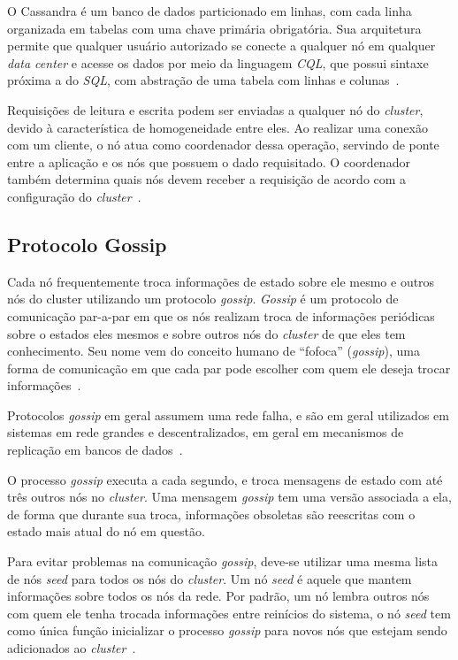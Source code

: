 O Cassandra é um banco de dados particionado em linhas, com cada linha organizada em tabelas com uma chave primária obrigatória. Sua arquitetura permite que qualquer usuário autorizado se conecte a qualquer nó em qualquer \emph{data center} e acesse os dados por meio da linguagem \emph{CQL}, que possui sintaxe próxima a do \emph{SQL}, com abstração de uma tabela com linhas e colunas~\cite{cassandradocs}. 

Requisições de leitura e escrita podem ser enviadas a qualquer nó do \emph{cluster}, devido à característica de homogeneidade entre eles. Ao realizar uma conexão com um cliente, o nó atua como coordenador dessa operação, servindo de ponte entre a aplicação e os nós que possuem o dado requisitado. O coordenador também determina quais nós devem receber a requisição de acordo com a configuração do \emph{cluster}~\cite{cassandradocs}. 

\subsection{Protocolo Gossip}

Cada nó frequentemente troca informações de estado sobre ele mesmo e outros nós do cluster utilizando um  protocolo \emph{gossip}. \emph{Gossip} é um protocolo de comunicação par-a-par em que os nós realizam  troca de informações periódicas sobre o estados eles mesmos e sobre outros nós do \emph{cluster} de que eles tem conhecimento. Seu nome vem do conceito humano de \enquote{fofoca} (\emph{gossip}), uma forma de comunicação em que cada par pode escolher com quem ele deseja trocar informações~\cite{cassandradocs, cassandraguide}. 

Protocolos \emph{gossip} em geral assumem uma rede falha, e são em geral utilizados em sistemas em rede grandes e descentralizados, em geral em mecanismos de replicação em bancos de dados~\cite{cassandraguide}. 

O processo \emph{gossip} executa a cada segundo, e troca mensagens de estado com até três outros nós no \emph{cluster}. Uma mensagem \emph{gossip} tem uma versão associada a ela, de forma que durante sua troca, informações obsoletas são reescritas com o estado mais atual do nó em questão.

Para evitar problemas na comunicação \emph{gossip}, deve-se utilizar uma mesma lista de nós \emph{seed} para todos os nós do \emph{cluster}. Um nó \emph{seed} é aquele que mantem informações sobre todos os nós da rede. Por padrão, um nó lembra outros nós com quem ele tenha trocada informações entre reinícios do sistema, o nó \emph{seed} tem como única função inicializar o processo \emph{gossip} para novos nós que estejam sendo adicionados ao \emph{cluster}~\cite{cassandradocs}.


